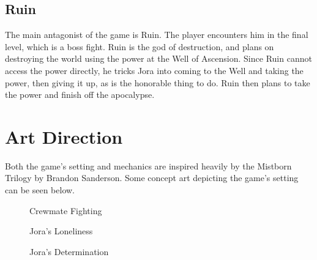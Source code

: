 \documentclass{article}
\begin{document}
\subsection{Ruin}
The main antagonist of the game is Ruin. The player encounters him in the final level, which is a boss fight. Ruin is the god of destruction, and plans on destroying the world using the power at the Well of Ascension. Since Ruin cannot access the power directly, he tricks Jora into coming to the Well and taking the power, then giving it up, as is the honorable thing to do. Ruin then plans to take the power and finish off the apocalypse.

\section{Art Direction}

Both the game's setting and mechanics are inspired heavily by the Mistborn Trilogy by Brandon Sanderson. Some concept art depicting the game's setting can be seen below.

\begin{figure}[!htb]
  \caption {Crewmate Fighting}
  \end{figure}

  \begin{figure}[!htb]
  \caption {Jora's Loneliness}
  \end{figure}

  \begin{figure}[!htb]
  \caption {Jora's Determination}
  \end{figure}
\end{document}
